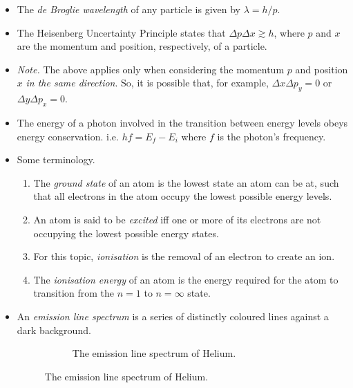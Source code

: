 \documentclass[oneside]{book}
\begin{document}
\begin{itemize}
    \item The \emph{de Broglie wavelength} of any particle is given by \(\lambda=h/p\).
    \item The Heisenberg Uncertainty Principle states that \(\Delta p\Delta x\gtrsim h\), where \(p\) and \(x\) are the momentum and position, respectively, of a particle. 
    \item \emph{Note.} The above applies only when considering the momentum \(p\) and position \(x\) \emph{in the same direction}. So, it is possible that, for example, \(\Delta x\Delta p_y=0\) or \(\Delta y\Delta p_x=0\).
    \item The energy of a photon involved in the transition between energy levels obeys energy conservation. i.e. \(hf=E_f-E_i\) where \(f\) is the photon's frequency.
    \item Some terminology.
    \begin{enumerate}
        \item The \emph{ground state} of an atom is the lowest state an atom can be at, such that all electrons in the atom occupy the lowest possible energy levels.
        \item An atom is said to be \emph{excited} iff one or more of its electrons are not occupying the lowest possible energy states.
        \item For this topic, \emph{ionisation} is the removal of an electron to create an ion.
        \item The \emph{ionisation energy} of an atom is the energy required for the atom to transition from the \(n=1\) to \(n=\infty\) state.
    \end{enumerate}
    \item[\AsteriskThin] An \emph{emission line spectrum} is a series of distinctly coloured lines against a dark background.
    \begin{figure}[H]
        \centering
        \begin{subfigure}[c]{\textwidth}
            \centering
            \pgfspectra[element=He,axis,label,label position=north west]
            \caption{The emission line spectrum of Helium.}
            \label{fig:emission-line-spectrum-helium}
        \end{subfigure}%


\end{figure}
\end{itemize}
\end{document}
